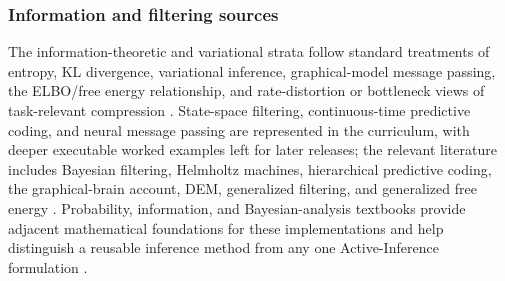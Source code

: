 \documentclass[
  english,
]{article}
\begin{document}
\subsubsection{Information and filtering
sources}\label{information-and-filtering-sources}

The information-theoretic and variational strata follow standard
treatments of entropy, KL divergence, variational inference,
graphical-model message passing, the ELBO/free energy relationship, and
rate-distortion or bottleneck views of task-relevant compression
\citep{shannon1948mathematical, beal2003variational, cover2006elements, tishby1999information, bishop2006pattern, jordan1999variational, winn2005variational, blei2017variational}.
State-space filtering, continuous-time predictive coding, and neural
message passing are represented in the curriculum, with deeper
executable worked examples left for later releases; the relevant
literature includes Bayesian filtering, Helmholtz machines, hierarchical
predictive coding, the graphical-brain account, DEM, generalized
filtering, and generalized free energy
\citep{sarkka2013bayesian, dayan1995helmholtz, rao1999predictive, friston2008hierarchical, friston2017graphical, friston2008dem, friston2010generalised, parr2019generalised, kataoka2026extended_predictive_coding, tschantz2023hybrid_predictive_coding}.
Probability, information, and Bayesian-analysis textbooks provide
adjacent mathematical foundations for these implementations and help
distinguish a reusable inference method from any one Active-Inference
formulation
\citep{mackay2003information_inference, jaynes2003probability_logic, murphy2012probabilistic_ml, gelman2013bayesian_analysis, murphy2022probabilistic_ml}.
\end{document}
